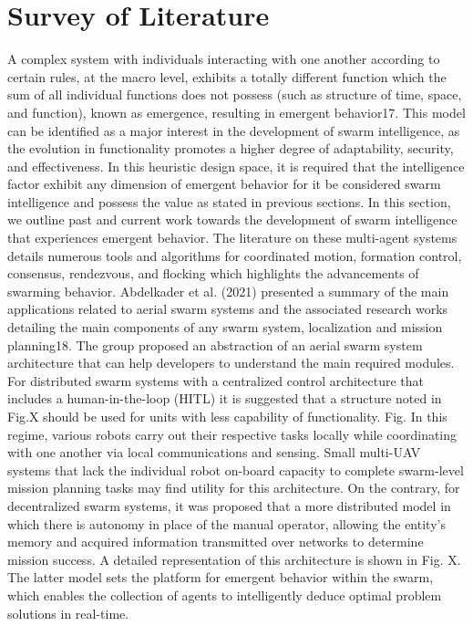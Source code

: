 \section*{Survey of Literature}
A complex system with individuals interacting with one another according to certain rules, at the macro level, exhibits a totally different function which the sum of all individual functions does not possess (such as structure of time, space, and function), known as emergence, resulting in emergent behavior17. This model can be identified as a major interest in the development of swarm intelligence, as the evolution in functionality promotes a higher degree of adaptability, security, and effectiveness. In this heuristic design space, it is required that the intelligence factor exhibit any dimension of emergent behavior for it be considered swarm intelligence and possess the value as stated in previous sections.  In this section, we outline past and current work towards the development of swarm intelligence that experiences emergent behavior. The literature on these multi-agent systems details numerous tools and algorithms for coordinated motion, formation control, consensus, rendezvous, and flocking which highlights the advancements of swarming behavior.
Abdelkader et al. (2021) presented a summary of the main applications related to aerial swarm systems and the associated research works detailing the main components of any swarm system, localization and mission planning18. The group proposed an abstraction of an aerial swarm system architecture that can help developers to understand the main required modules. For distributed swarm systems with a centralized control architecture that includes a human-in-the-loop (HITL) it is suggested that a structure noted in Fig.X should be used for units with less capability of functionality.  
Fig.
In this regime, various robots carry out their respective tasks locally while coordinating with one another via local communications and sensing. Small multi-UAV systems that lack the individual robot on-board capacity to complete swarm-level mission planning tasks may find utility for this architecture. On the contrary, for decentralized swarm systems, it was proposed that a more distributed model in which there is autonomy in place of the manual operator, allowing the entity’s memory and acquired information transmitted over networks to determine mission success. A detailed representation of this architecture is shown in Fig. X. The latter model sets the platform for emergent behavior within the swarm, which enables the collection of agents to intelligently deduce optimal problem solutions in real-time.
